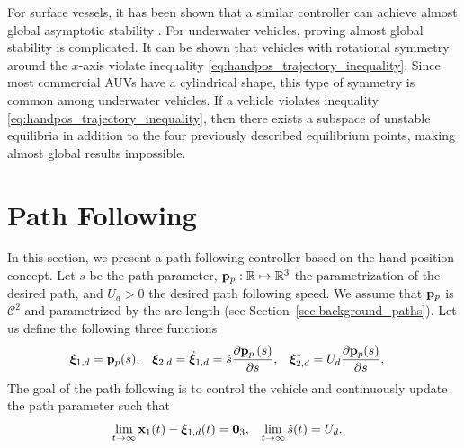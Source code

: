 \begin{rmk*}
    For surface vessels, it has been shown that a similar controller can achieve almost global asymptotic stability \cite{paliotta_trajectory_2019}.
    For underwater vehicles, proving almost global stability is complicated.
    It can be shown that vehicles with rotational symmetry around the $x$-axis violate inequality \eqref{eq:handpos_trajectory_inequality}.
    Since most commercial AUVs have a cylindrical shape, this type of symmetry is common among underwater vehicles.
    If a vehicle violates inequality \eqref{eq:handpos_trajectory_inequality}, then there exists a subspace of unstable equilibria in addition to the four previously described equilibrium points, making almost global results impossible.
\end{rmk*}

\section{Path Following}
\label{sec:handpos_trajectory_path_following}
In this section, we present a path-following controller based on the hand position concept.
Let $s$ be the path parameter, $\mathbf{p}_p: \mathbb{R} \mapsto \mathbb{R}^{3}$ the parametrization of the desired path, and $U_d > 0$ the desired path following speed.
We assume that $\mathbf{p}_p$ is $\mathcal{C}^2$ and parametrized by the arc length (see Section~\ref{sec:background_paths}).
Let us define the following three functions
\begin{align}
    \bm{\xi}_{1, d} &= \mathbf{p}_p(s), &
    \bm{\xi}_{2, d} &= \dot{\bm{\xi}}_{1, d} = \dot{s}\frac{\partial \mathbf{p}_p\left(s\right)}{\partial s}, &
    \bm{\xi}_{2, d}^{*} &= U_d \frac{\partial \mathbf{p}_p(s)}{\partial s},
\end{align}
The goal of the path following is to control the vehicle and continuously update the path parameter such that
\begin{align}
    \lim_{t \rightarrow \infty} \mathbf{x}_1(t) - \bm{\xi}_{1, d}(t) &= \mathbf{0}_3, &
    \lim_{t \rightarrow \infty} \dot{s}(t) &= U_d. \label{eq:handpos_trajectory_control_goal_path}
\end{align}

